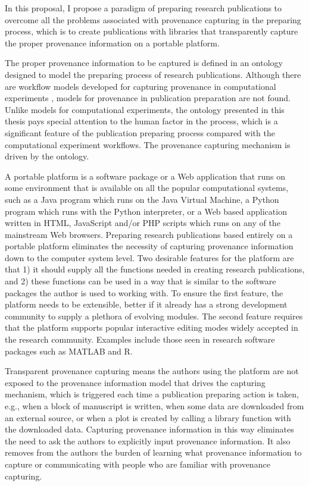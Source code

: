 In this proposal, I propose a paradigm of preparing research publications to overcome all the problems associated with provenance capturing in the preparing process, which is to create publications with libraries that transparently capture the proper provenance information on a portable platform.

The proper provenance information to be captured is defined in an ontology designed to model the preparing process of research publications. Although there are workflow models developed for capturing provenance in computational experiments \cite{groth2006architecture, groth2009recording}, models for provenance in publication preparation are not found. Unlike models for computational experiments, the ontology presented in this thesis pays special attention to the human factor in the process, which is a significant feature of the publication preparing process compared with the computational experiment workflows. The provenance capturing mechanism is driven by the ontology.

A portable platform is a software package or a Web application that runs on some environment that is available on all the popular computational systems, such as a Java program which runs on the Java Virtual Machine, a Python program which runs with the Python interpreter, or a Web based application written in HTML, JavaScript and/or PHP scripts which runs on any of the mainstream Web browsers. Preparing research publications based entirely on a portable platform eliminates the necessity of capturing provenance information down to the computer system level. Two desirable features for the platform are that 1) it should supply all the functions needed in creating research publications, and 2) these functions can be used in a way that is similar to the software packages the author is used to working with. To ensure the first feature, the platform needs to be extensible, better if it already has a strong development community to supply a plethora of evolving modules. The second feature requires that the platform supports popular interactive editing modes widely accepted in the research community. Examples include those seen in research software packages such as MATLAB and R.

Transparent provenance capturing means the authors using the platform are not exposed to the provenance information model that drives the capturing mechanism, which is triggered each time a publication preparing action is taken, e.g., when a block of manuscript is written, when some data are downloaded from an external source, or when a plot is created by calling a library function with the downloaded data. Capturing provenance information in this way eliminates the need to ask the authors to explicitly input provenance information. It also removes from the authors the burden of learning what provenance information to capture or communicating with people who are familiar with provenance capturing.

